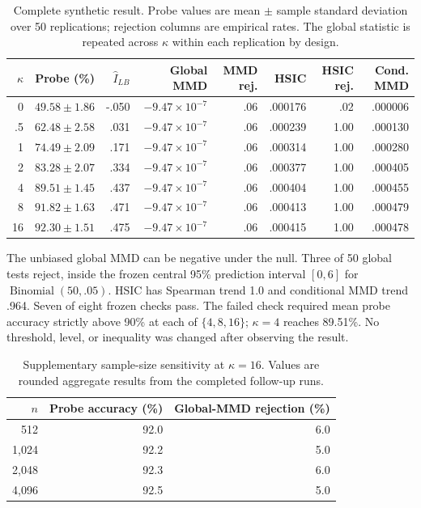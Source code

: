 \begin{table}[ht]
\caption{Complete synthetic result.  Probe values are mean $\pm$ sample
standard deviation over 50 replications; rejection columns are empirical
rates.  The global statistic is repeated across $\kappa$ within each
replication by design.}
\label{tab:synthetic-full-v9}
\centering
\scriptsize
\setlength{\tabcolsep}{3.5pt}
\begin{tabular}{rrrrrrrr}
\toprule
$\kappa$ & Probe (\%) & $\widehat I_{LB}$ & Global MMD & MMD rej. & HSIC & HSIC rej. & Cond. MMD \\
\midrule
0   & $49.58\pm1.86$ & -.050 & $-9.47\!\times\!10^{-7}$ & .06 & .000176 & .02 & .000006 \\
.5  & $62.48\pm2.58$ & .031 & $-9.47\!\times\!10^{-7}$ & .06 & .000239 & 1.00 & .000130 \\
1   & $74.49\pm2.09$ & .171 & $-9.47\!\times\!10^{-7}$ & .06 & .000314 & 1.00 & .000280 \\
2   & $83.28\pm2.07$ & .334 & $-9.47\!\times\!10^{-7}$ & .06 & .000377 & 1.00 & .000405 \\
4   & $89.51\pm1.45$ & .437 & $-9.47\!\times\!10^{-7}$ & .06 & .000404 & 1.00 & .000455 \\
8   & $91.82\pm1.63$ & .471 & $-9.47\!\times\!10^{-7}$ & .06 & .000413 & 1.00 & .000479 \\
16  & $92.30\pm1.51$ & .475 & $-9.47\!\times\!10^{-7}$ & .06 & .000415 & 1.00 & .000478 \\
\bottomrule
\end{tabular}
\end{table}

The unbiased global MMD can be negative under the null.  Three of 50 global
tests reject, inside the frozen central 95\% prediction interval $[0,6]$ for
$\operatorname{Binomial}(50,.05)$.  HSIC has Spearman trend 1.0 and
conditional MMD trend .964.  Seven of eight frozen checks pass.  The failed
check required mean probe accuracy strictly above 90\% at each of
$\{4,8,16\}$; $\kappa=4$ reaches 89.51\%.  No threshold, level, or inequality
was changed after observing the result.

\begin{table}[ht]
\caption{Supplementary sample-size sensitivity at $\kappa=16$.  Values are
rounded aggregate results from the completed follow-up runs.}
\label{tab:synthetic-n-v9}
\centering
\small
\begin{tabular}{rrr}
\toprule
$n$ & Probe accuracy (\%) & Global-MMD rejection (\%) \\
\midrule
512  & 92.0 & 6.0 \\
1,024 & 92.2 & 5.0 \\
2,048 & 92.3 & 6.0 \\
4,096 & 92.5 & 5.0 \\
\bottomrule
\end{tabular}
\end{table}

